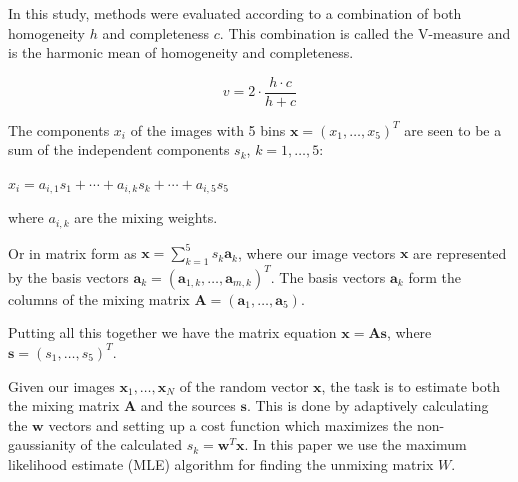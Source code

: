 \documentclass[a4paper,11pt]{article}
\begin{document}



In this study, methods were evaluated according to a combination of both homogeneity $h$ and completeness $c$. This combination is called the V-measure and is the harmonic mean of homogeneity and completeness.

\begin{equation}
v = 2 \cdot \frac{h \cdot c}{h + c}
\end{equation}

The components $x_i$ of the images with 5 bins $\boldsymbol{x}=(x_1,\ldots,x_5)^T$ are seen to be a sum of the independent components $s_k$, $k=1,\ldots,5$:

$x_i = a_{i,1} s_1 + \cdots + a_{i,k} s_k + \cdots + a_{i,5} s_5$

where $a_{i,k}$ are the mixing weights.

Or in matrix form as $\boldsymbol{x}=\sum_{k=1}^{5} s_k \boldsymbol{a}_k$, where our image vectors $\boldsymbol{x}$ are represented by the basis vectors $\boldsymbol{a}_k=(\boldsymbol{a}_{1,k},\ldots,\boldsymbol{a}_{m,k})^T$. The basis vectors $\boldsymbol{a}_k$ form the columns of the mixing matrix $\boldsymbol{A}=(\boldsymbol{a}_1,\ldots,\boldsymbol{a}_5)$.

Putting all this together we have the matrix equation $\boldsymbol{x}=\boldsymbol{A} \boldsymbol{s}$, where $\boldsymbol{s}=(s_1,\ldots,s_5)^T$.

Given our images $\boldsymbol{x}_1,\ldots,\boldsymbol{x}_N$ of the random vector $\boldsymbol{x}$, the task is to estimate both the mixing matrix $\boldsymbol{A}$ and the sources $\boldsymbol{s}$. This is done by adaptively calculating the $\boldsymbol{w}$ vectors and setting up a cost function which maximizes the non-gaussianity of the calculated $s_k = \boldsymbol{w}^T \boldsymbol{x}$. In this paper we use the maximum likelihood estimate (MLE) algorithm for finding the unmixing matrix $W$. 









\vfill
\end{document}
